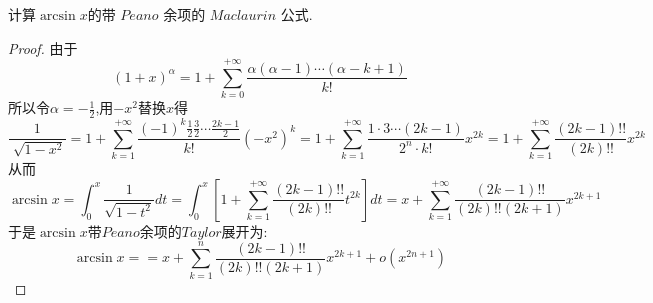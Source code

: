 \documentclass[lang=cn,newtx,10pt,scheme=chinese]{../Template/elegantbook}
\begin{document}
\begin{exercise}
   计算\(\arcsin x\)的带 $Peano$ 余项的 $Maclaurin$ 公式.
    \begin{proof}
    由于
    \begin{equation}
    (1+x)^\alpha =1+\sum_{k=0}^{+\infty}\frac{\alpha(\alpha-1)\cdots(\alpha-k+1)}{k!}
        \nonumber
    \end{equation}
    所以令$\alpha=-\frac{1}{2}$,用$-x^2$替换$x$得
    \begin{equation}
    \frac{1}{\sqrt[]{1-x^2} } =1+\sum_{k=1}^{+\infty}\frac{(-1)^k\frac{1}{2}\frac{3}{2}\cdots\frac{2k-1}{2}}{k!}(-x^2)^{k}
    =1+\sum_{k=1}^{+\infty}\frac{1\cdot3\cdots(2k-1)}{2^n\cdot k!}x^{2k}
    =1+\sum_{k=1}^{+\infty}\frac{(2k-1)!!}{(2k)!!}x^{2k}
        \nonumber
    \end{equation}
    从而
    \begin{equation}
    \arcsin x=\int_{0}^{x} \frac{1}{\sqrt{1-t^2}}dt=\int_{0}^{x} [1+\sum_{k=1}^{+\infty}\frac{(2k-1)!!}{(2k)!!}t^{2k}]dt
    =x+\sum_{k=1}^{+\infty}\frac{(2k-1)!!}{(2k)!!(2k+1)}x^{2k+1}
        \nonumber
    \end{equation}
    于是$\arcsin x$带$Peano$余项的$Taylor$展开为:
    \begin{equation}
    \arcsin x==x+\sum_{k=1}^{n}\frac{(2k-1)!!}{(2k)!!(2k+1)}x^{2k+1}+o(x^{2n+1})
        \nonumber
    \end{equation}
    \end{proof}
\end{exercise}
\end{document}
